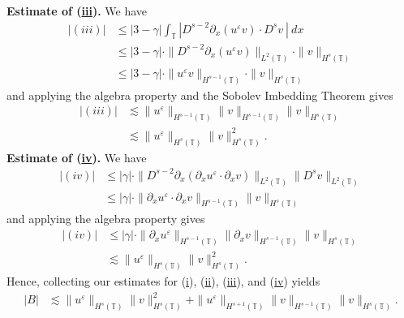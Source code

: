 \documentclass[12pt,reqno]{amsart}
\newcommand{\p}{\partial}
\newcommand{\ci}{\mathbb{T}}
\newcommand{\ee}{\varepsilon}
\theoremstyle{plain}  %
\theoremstyle{definition}
\begin{document}
\begin{appendices}
\vskip0.1in
{\bf Estimate of (\hyperref[8u]{iii}).} We have
	\begin{equation}
		\begin{split}
			|(iii)|
			& \le |3-\gamma| \int_{\ci} |D^{s-2} \p_x (u^\ee v) \cdot D^s v
			\ | \ dx
			\\
			& \le |3- \gamma| \cdot  \|D^{s-2}\p_x (u^\ee v)
			\|_{L^2(\ci)} \cdot \|v\|_{H^s(\ci)}
			\\
			& \le |3- \gamma| \cdot  \| u^\ee v \|_{H^{s -1}(\ci)} \cdot \|v\|_{H^s(\ci)}
			\label{12u}
		\end{split}
	\end{equation}
	and applying the algebra property and the Sobolev Imbedding Theorem gives
	\begin{equation}
		\begin{split}
			|(iii)| & \lesssim \|u^\ee\|_{H^{s-1}(\ci)} \|v\|_{H^{s-1}(\ci)}
			\|v\|_{H^s(\ci)}
			\\
			& \lesssim \|u^\ee\|_{H^{s}(\ci)} \|v\|_{H^{s}(\ci)}^2.
			\label{13u}
		\end{split}
	\end{equation}
	\vskip0.1in
	{\bf Estimate of (\hyperref[8u]{iv}).} We have
	\begin{equation*}
		\begin{split}
			|(iv)|
			& \le |\gamma| \cdot \|D^{s-2} \p_x (\p_x u^\ee \cdot \p_x v)
			\|_{L^2(\ci)} \|D^s v\|_{L^2(\ci)}
			\\
			& \le |\gamma| \cdot \|\p_x u^\ee \cdot \p_x v \|_{H^{s-1}(\ci)}
			\|v\|_{H^s(\ci)}
		\end{split}
	\end{equation*}
	and applying the algebra property gives
	\begin{equation*}
		\begin{split}
			|(iv)|
			& \le |\gamma| \cdot \|\p_x u^\ee \|_{H^{s-1}(\ci)} \|\p_x v
			\|_{H^{s-1}(\ci)} \|v\|_{H^s(\ci)}
			\\
			& \lesssim \|u^\ee\|_{H^s(\ci)} \|v\|_{H^s(\ci)}^2.
		\end{split}
	\end{equation*}
	Hence, collecting our estimates for (\hyperref[8u]{i}),
	(\hyperref[8u]{ii}), (\hyperref[8u]{iii}), and (\hyperref[8u]{iv})
	yields
		\begin{equation}
		\begin{split}
			|B| 
			& \lesssim
			\|u^\ee\|_{H^s(\ci)}
			\|v\|_{H^s(\ci)}^2 + \|u^\ee\|_{H^{s+1}(\ci)}
			\|v\|_{H^{s-1}(\ci)} \|v\|_{H^s(\ci)}.
			\label{14u}
		\end{split}

\end{equation}
\end{appendices}
\end{document}
